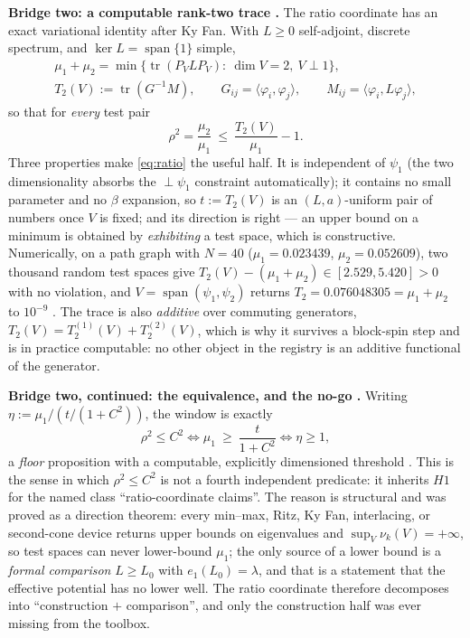 \textbf{Bridge two: a computable rank-two trace \LT.} The ratio coordinate has an exact
variational identity after Ky Fan. With $L\ge0$ self-adjoint, discrete spectrum, and
$\ker L=\operatorname{span}\{1\}$ simple,
\begin{equation}
  \begin{gathered}
    \mu_1+\mu_2=\min\bigl\{\operatorname{tr}(P_VLP_V):\ \dim V=2,\ V\perp1\bigr\},\\
    T_2(V):=\operatorname{tr}(G^{-1}M),\qquad
    G_{ij}=\langle\varphi_i,\varphi_j\rangle,\qquad
    M_{ij}=\langle\varphi_i,L\varphi_j\rangle ,
  \end{gathered}
  \label{eq:kyfan}
\end{equation}
so that for \emph{every} test pair
\begin{equation}
  \rho^2=\frac{\mu_2}{\mu_1}\ \le\ \frac{T_2(V)}{\mu_1}-1 .
  \label{eq:ratio}
\end{equation}
Three properties make \eqref{eq:ratio} the useful half. It is independent of $\psi_1$ (the two
dimensionality absorbs the $\perp\psi_1$ constraint automatically); it contains no small parameter
and no $\beta$ expansion, so $t:=T_2(V)$ is an $(L,a)$-uniform pair of numbers once $V$ is fixed;
and its direction is right --- an upper bound on a minimum is obtained by \emph{exhibiting} a test
space, which is constructive. Numerically, on a path graph with $N=40$ ($\mu_1=0.023439$,
$\mu_2=0.052609$), two thousand random test spaces give $T_2(V)-(\mu_1+\mu_2)\in[2.529,5.420]>0$
with no violation, and $V=\operatorname{span}(\psi_1,\psi_2)$ returns
$T_2=0.076048305=\mu_1+\mu_2$ to $10^{-9}$ \LE. The trace is also \emph{additive} over commuting
generators, $T_2(V)=T_2^{(1)}(V)+T_2^{(2)}(V)$, which is why it survives a block-spin step and is
in practice computable: no other object in the registry is an additive functional of the generator.

\textbf{Bridge two, continued: the equivalence, and the no-go \LN.} Writing
$\eta:=\mu_1/(t/(1+C^2))$, the window is exactly
\begin{equation}
  \rho^2\le C^2
  \iff \mu_1\ \ge\ \frac{t}{1+C^2}
  \iff \eta\ge1 ,
  \label{eq:eta}
\end{equation}
a \emph{floor} proposition with a computable, explicitly dimensioned threshold \LT. This is the
sense in which $\rho^2\le C^2$ is not a fourth independent predicate: it inherits $H1$ \LN{} for the
named class ``ratio-coordinate claims''. The reason is structural and was proved as a direction
theorem: every min--max, Ritz, Ky Fan, interlacing, or second-cone device returns upper bounds on
eigenvalues and $\sup_V\nu_k(V)=+\infty$, so test spaces can never lower-bound $\mu_1$; the only
source of a lower bound is a \emph{formal comparison} $L\ge L_0$ with $e_1(L_0)=\lambda$, and that
is a statement that the effective potential has no lower well. The ratio coordinate therefore
decomposes into ``construction $+$ comparison'', and only the construction half was ever missing
from the toolbox.

